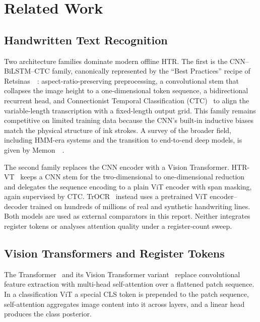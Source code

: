 \section{Related Work}
\label{sec:related_work}

\subsection{Handwritten Text Recognition}
\label{sec:rw_htr}

Two architecture families dominate modern offline HTR. The first is the CNN--BiLSTM--CTC family, canonically represented by the ``Best Practices'' recipe of Retsinas~\etal~\cite{retsinas2024htrbestpractices}: aspect-ratio-preserving preprocessing, a convolutional stem that collapses the image height to a one-dimensional token sequence, a bidirectional recurrent head, and Connectionist Temporal Classification (CTC)~\cite{graves2006ctc} to align the variable-length transcription with a fixed-length output grid. This family remains competitive on limited training data because the CNN's built-in inductive biases match the physical structure of ink strokes. A survey of the broader field, including HMM-era systems and the transition to end-to-end deep models, is given by Memon~\etal~\cite{memon2020htrsurvey}.

The second family replaces the CNN encoder with a Vision Transformer. HTR-VT~\cite{li2024htrvt} keeps a CNN stem for the two-dimensional to one-dimensional reduction and delegates the sequence encoding to a plain ViT encoder with span masking, again supervised by CTC. TrOCR~\cite{li2023trocr} instead uses a pretrained ViT encoder--decoder trained on hundreds of millions of real and synthetic handwriting lines. Both models are used as external comparators in this report. Neither integrates register tokens or analyses attention quality under a register-count sweep.

\subsection{Vision Transformers and Register Tokens}
\label{sec:rw_registers}

The Transformer~\cite{vaswani2017attention} and its Vision Transformer variant~\cite{dosovitskiy2021vit} replace convolutional feature extraction with multi-head self-attention over a flattened patch sequence. In a classification ViT a special CLS token is prepended to the patch sequence, self-attention aggregates image content into it across layers, and a linear head produces the class posterior.

